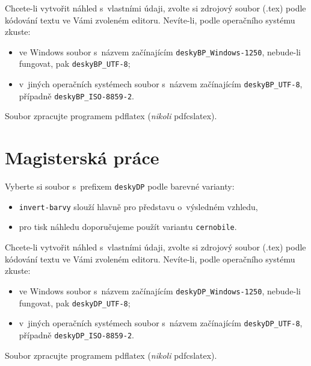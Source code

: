 \documentclass[a4paper]{article}
\begin{document}
Chcete-li vytvořit náhled s~vlastními údaji, zvolte si zdrojový soubor (.tex) podle kódování textu ve Vámi zvoleném editoru. Nevíte-li, podle operačního systému zkuste:
\begin{itemize}
	\item ve Windows soubor s~názvem začínajícím \verb|deskyBP_Windows-1250|, nebude-li fungovat, pak \verb|deskyBP_UTF-8|;
	\item v~jiných operačních systémech soubor s~názvem začínajícím \verb|deskyBP_UTF-8|, případně \verb|deskyBP_ISO-8859-2|.
\end{itemize}

Soubor zpracujte programem pdflatex (\emph{nikoli} pdfcslatex).

\section*{Magisterská práce}

Vyberte si soubor s~prefixem \verb|deskyDP| podle barevné varianty:
\begin{itemize}
	\item \verb|invert-barvy| slouží hlavně pro představu o~výsledném vzhledu,
	\item pro tisk náhledu doporučujeme použít variantu \verb|cernobile|.
\end{itemize}

Chcete-li vytvořit náhled s~vlastními údaji, zvolte si zdrojový soubor (.tex) podle kódování textu ve Vámi zvoleném editoru. Nevíte-li, podle operačního systému zkuste:
\begin{itemize}
	\item ve Windows soubor s~názvem začínajícím \verb|deskyDP_Windows-1250|, nebude-li fungovat, pak \verb|deskyDP_UTF-8|;
	\item v~jiných operačních systémech soubor s~názvem začínajícím \verb|deskyDP_UTF-8|, případně \verb|deskyDP_ISO-8859-2|.
\end{itemize}

Soubor zpracujte programem pdflatex (\emph{nikoli} pdfcslatex).
\end{document}
